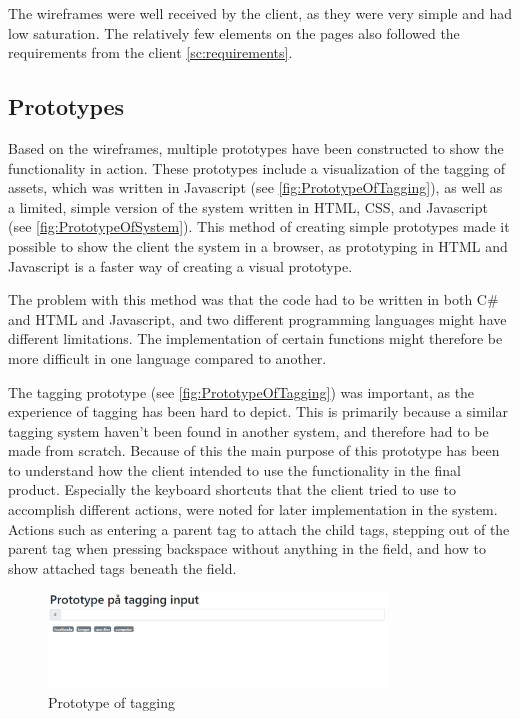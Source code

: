 The wireframes were well received by the client, as they were very simple and had low saturation. The relatively few elements on the pages also followed the requirements from the client \autoref{sc:requirements}.

\subsection{Prototypes}
Based on the wireframes, multiple prototypes have been constructed to show the functionality in action. These prototypes include a visualization of the tagging of assets, which was written in Javascript (see \autoref{fig:PrototypeOfTagging}), as well as a limited, simple version of the system written in HTML, CSS, and Javascript (see \autoref{fig:PrototypeOfSystem}). This method of creating simple prototypes made it possible to show the client the system in a browser, as prototyping in HTML and Javascript is a faster way of creating a visual prototype.
\par

The problem with this method was that the code had to be written in both C\# and HTML and Javascript, and two different programming languages might have different limitations. The implementation of certain functions might therefore be more difficult in one language compared to another.
\par
The tagging prototype (see \autoref{fig:PrototypeOfTagging}) was important, as the experience of tagging has been hard to depict. This is primarily because a similar tagging system haven't been found in another system, and therefore had to be made from scratch. Because of this the main purpose of this prototype has been to understand how the client intended to use the functionality in the final product. Especially the keyboard shortcuts that the client tried to use to accomplish different actions, were noted for later implementation in the system. Actions such as entering a parent tag to attach the child tags, stepping out of the parent tag when pressing backspace without anything in the field, and how to show attached tags beneath the field.

\begin{figure}[H]
    \centering
    \includegraphics[width=0.8\textwidth]{figures/Prototypes/PrototypeOfTagging.png}
    \caption{Prototype of tagging}
    \label{fig:PrototypeOfTagging}
\end{figure}

